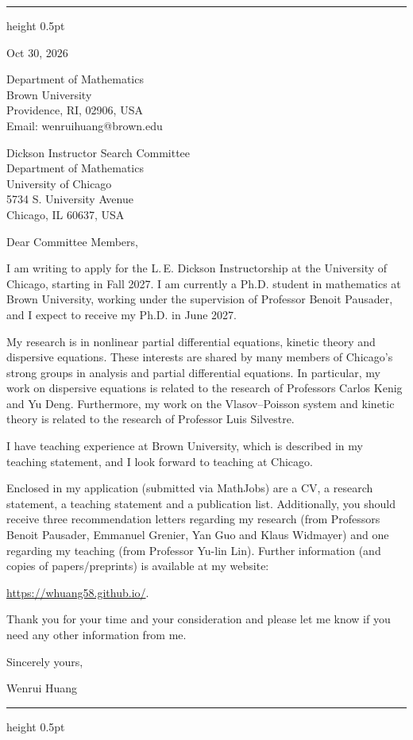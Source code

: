 \documentclass[10pt]{article}
\begin{document}
\vspace{0.08in}
\hrule height 0.5pt

\vspace{0.47in}
\hfill
\begin{minipage}{2.27in}
Oct 30, 2026

\vspace{0.16in}
Department of Mathematics\\
Brown University\\
Providence, RI, 02906, USA\\
Email: wenrui\textunderscore huang@brown.edu
\end{minipage}

\vspace{0.30in}
Dickson Instructor Search Committee\\
Department of Mathematics\\
University of Chicago\\
5734 S. University Avenue\\
Chicago, IL 60637, USA
 
\vspace{0.16in}
Dear Committee Members,
 
I am writing to apply for the L.\,E. Dickson Instructorship at the University of Chicago, starting in Fall 2027. I am currently a Ph.D. student in mathematics at Brown University, working under the supervision of Professor Benoit Pausader, and I expect to receive my Ph.D. in June 2027.
 
My research is in nonlinear partial differential equations, kinetic theory and dispersive equations. These interests are shared by many members of Chicago's strong groups in analysis and partial differential equations. In particular, my work on dispersive equations is related to the research of Professors Carlos Kenig and Yu Deng. Furthermore, my work on the Vlasov--Poisson system and kinetic theory is related to the research of Professor Luis Silvestre.
 
I have teaching experience at Brown University, which is described in my teaching statement, and I look forward to teaching at Chicago.
 
Enclosed in my application (submitted via MathJobs) are a CV, a research statement, a teaching statement and a publication list. Additionally, you should receive three recommendation letters regarding my research (from Professors Benoit Pausader, Emmanuel Grenier, Yan Guo and Klaus Widmayer) and one regarding my teaching (from Professor Yu-lin Lin). Further information (and copies of papers/preprints) is available at my website:

\url{https://whuang58.github.io/}.
 
 \medskip
Thank you for your time and your consideration and please let me know if you
need any other information from me.
 
\vspace{0.12in}
Sincerely yours,
 

Wenrui Huang
 
\vfill
\hrule height 0.5pt
 
\end{document}
